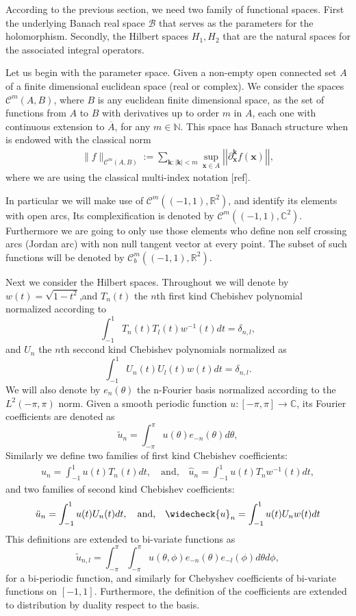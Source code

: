 \documentclass{article}
\newcommand{\todo}[1]{{\color{red}[#1]}}
\newcommand{\IC}{{\mathbb C}}
\newcommand{\IN}{{\mathbb N}}
\newcommand{\IR}{{\mathbb R}}
\newcommand{\cmspace}[3]{\mathcal{C}^{#1} \left( #2, #3 \right)}
\newcommand{\rgeo}[1]{\mathcal{C}_b^{#1}\left( (-1,1), \IR^2 \right)}
\newcommand{\bk}{\bm{k}}
\newcommand{\bx}{\bm{x}}
\begin{document}
According to the previous section, we need two family of functional spaces. First the underlying Banach real space $\mathcal{B}$ that serves as the parameters for the holomorphism. Secondly, the Hilbert spaces $H_1,H_2$ that are the natural spaces for the associated integral operators. 

Let us begin with the parameter space. Given a non-empty open connected set $A$ of a finite dimensional euclidean space (real or complex). We consider the spaces $\cmspace{m}{A}{B}$, where $B$ is any euclidean finite dimensional space, as the set of functions from $A$ to $B$ with derivatives up to order $m$ in $A$, each one with continuous extension to $\overline{A}$, for any $m \in \IN$. This space has Banach structure when is endowed with the classical norm 
\begin{align*}
\| f \|_{\cmspace{m}{A}{B}} := \sum_{\bk: |\bk| < m } \sup_{\bx \in A}  \left\vert\left\vert\partial_{\bx}^{\bk} f(\bx) \right\vert\right\vert,
\end{align*}
where we are using the classical multi-index notation \todo{ref}. 

In particular we will make use of $\cmspace{m}{(-1,1)}{\IR^2}$, and identify its elements with open arcs, Its complexification is denoted by $\cmspace{m}{(-1,1)}{\IC^2}$. Furthermore we are going to only use those elements who define non self crossing arcs (Jordan arc) with non null tangent vector at every point. The subset of such functions will be denoted by $\rgeo{m}$. 

Next we consider the Hilbert spaces. Throughout we will denote by $w(t) = \sqrt{1-t^2}$,and $T_n(t)$ the $n$th first kind Chebishev polynomial normalized according to $$\int_{-1}^1 T_n(t) T_l(t) w^{-1}(t) dt = \delta_{n,l},$$ and $U_n$ the $n$th seccond kind Chebishev polynomials normalized as 
$$\int_{-1}^1 U_n(t) U_l(t) w(t) dt = \delta_{n,l}.$$
 We will also denote by $e_n(\theta)$ the n-Fourier basis normalized according to the $L^2(-\pi,\pi)$ norm. 
Given a smooth periodic function $u :[-\pi,\pi] \rightarrow \IC$, its Fourier coefficients are denoted as
$$
\widetilde{u}_n = \int_{-\pi}^\pi u(\theta) e_{-n}(\theta) d\theta, 
$$
Similarly we define two families of first kind Chebishev coefficients:
\begin{align*}
u_n = \int_{-1}^{1} u(t) T_n(t) dt, \quad \text{and,} \quad  \widehat{u}_n = \int_{-1}^1 u(t) T_n w^{-1}(t)dt, 
\end{align*}
and two families of second kind Chebishev coefficients:
\begin{align*}
\ddot{u}_n = \int_{-1}^1 u(t) U_n (t) dt,\quad \text{and,}\quad \widecheck{u} _n = \int_{-1}^1 u(t) U_n w(t) dt
\end{align*}
This definitions are extended to bi-variate functions as 
$$\widetilde{u}_{n,l} = \int_{-\pi}^{\pi}\int_{-\pi}^\pi u(\theta,\phi) e_{-n}(\theta)e_{-l}(\phi) d\theta d\phi,$$
for a bi-periodic function, and similarly  for Chebyshev coefficients of  bi-variate functions on $[-1,1]$. Furthermore, the definition of the coefficients are extended to distribution by duality respect to the basis. 
\end{document}
